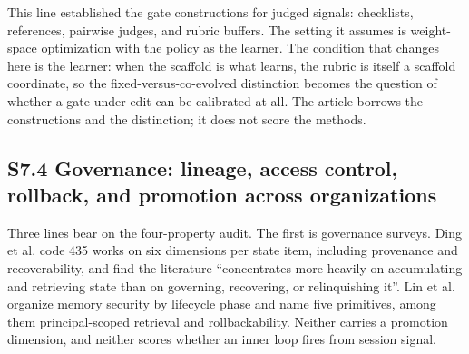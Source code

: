 \documentclass[
]{article}
\begin{document}
This line established the gate constructions for judged signals:
checklists, references, pairwise judges, and rubric buffers. The setting
it assumes is weight-space optimization with the policy as the learner.
The condition that changes here is the learner: when the scaffold is
what learns, the rubric is itself a scaffold coordinate, so the
fixed-versus-co-evolved distinction becomes the question of whether a
gate under edit can be calibrated at all. The article borrows the
constructions and the distinction; it does not score the methods.

\subsection{S7.4 Governance: lineage, access control, rollback, and
promotion across
organizations}\label{s7.4-governance-lineage-access-control-rollback-and-promotion-across-organizations}

Three lines bear on the four-property audit. The first is governance
surveys. Ding et al. \cite{ding2026alwayson} code 435 works on six
dimensions per state item, including provenance and recoverability, and
find the literature ``concentrates more heavily on accumulating and
retrieving state than on governing, recovering, or relinquishing it''.
Lin et al. \cite{lin2026memorysecurity} organize memory security by
lifecycle phase and name five primitives, among them principal-scoped
retrieval and rollbackability. Neither carries a promotion dimension,
and neither scores whether an inner loop fires from session signal.
\end{document}
